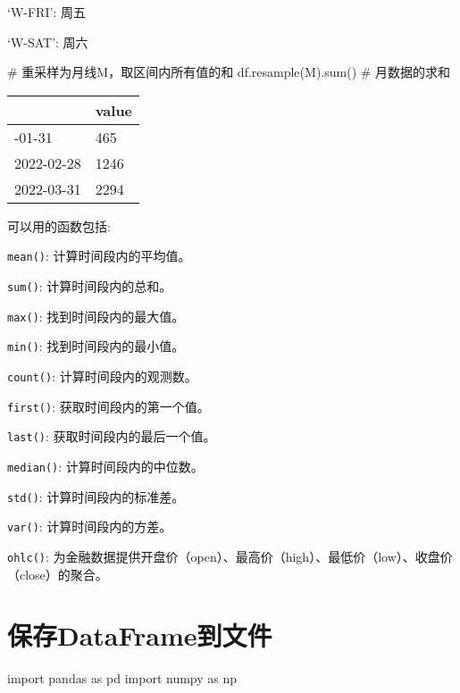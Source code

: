 \documentclass[
  letterpaper,
  DIV=11,
  numbers=noendperiod]{scrreprt}
\newenvironment{Shaded}{\begin{snugshade}}{\end{snugshade}}
\newcommand{\BuiltInTok}[1]{\textcolor[rgb]{0.00,0.23,0.31}{#1}}
\newcommand{\CommentTok}[1]{\textcolor[rgb]{0.37,0.37,0.37}{#1}}
\newcommand{\ImportTok}[1]{\textcolor[rgb]{0.00,0.46,0.62}{#1}}
\newcommand{\NormalTok}[1]{\textcolor[rgb]{0.00,0.23,0.31}{#1}}
\newcommand{\StringTok}[1]{\textcolor[rgb]{0.13,0.47,0.30}{#1}}
\begin{document}
`W-FRI': 周五

`W-SAT': 周六

\begin{Shaded}
\begin{Highlighting}[]
\CommentTok{\# 重采样为月线M，取区间内所有值的和}
\NormalTok{df.resample(}\StringTok{\textquotesingle{}M\textquotesingle{}}\NormalTok{).}\BuiltInTok{sum}\NormalTok{() }\CommentTok{\# 月数据的求和}
\end{Highlighting}
\end{Shaded}

\begin{longtable}[]{@{}ll@{}}
\toprule\noalign{}
& value \\
\midrule\noalign{}
\endhead
\bottomrule\noalign{}
\endlastfoot
2022-01-31 & 465 \\
2022-02-28 & 1246 \\
2022-03-31 & 2294 \\
\end{longtable}

可以用的函数包括:

\texttt{mean()}: 计算时间段内的平均值。

\texttt{sum()}: 计算时间段内的总和。

\texttt{max()}: 找到时间段内的最大值。

\texttt{min()}: 找到时间段内的最小值。

\texttt{count()}: 计算时间段内的观测数。

\texttt{first()}: 获取时间段内的第一个值。

\texttt{last()}: 获取时间段内的最后一个值。

\texttt{median()}: 计算时间段内的中位数。

\texttt{std()}: 计算时间段内的标准差。

\texttt{var()}: 计算时间段内的方差。

\texttt{ohlc()}:
为金融数据提供开盘价（open）、最高价（high）、最低价（low）、收盘价（close）的聚合。

\hypertarget{ux4fddux5b58dataframeux5230ux6587ux4ef6}{%
\section{保存DataFrame到文件}\label{ux4fddux5b58dataframeux5230ux6587ux4ef6}}

\begin{Shaded}
\begin{Highlighting}[]
\ImportTok{import}\NormalTok{ pandas }\ImportTok{as}\NormalTok{ pd}
\ImportTok{import}\NormalTok{ numpy }\ImportTok{as}\NormalTok{ np}
\end{Highlighting}
\end{Shaded}
\end{document}
